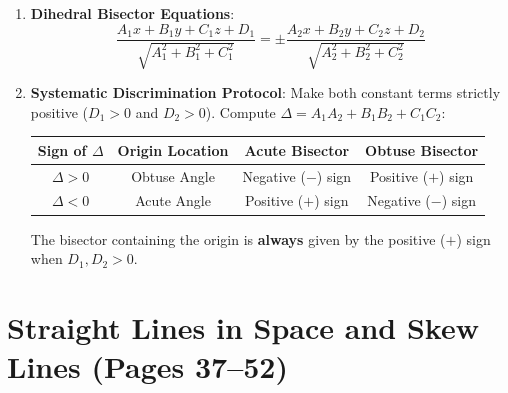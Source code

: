\begin{theorembox}
\begin{enumerate}
    \item \textbf{Dihedral Bisector Equations}:
    \begin{equation}
        \boxed{\frac{A_1 x + B_1 y + C_1 z + D_1}{\sqrt{A_1^2 + B_1^2 + C_1^2}} = \pm \frac{A_2 x + B_2 y + C_2 z + D_2}{\sqrt{A_2^2 + B_2^2 + C_2^2}}}
    \end{equation}
    \item \textbf{Systematic Discrimination Protocol}:
    Make both constant terms strictly positive ($D_1 > 0$ and $D_2 > 0$). Compute $\Delta = A_1 A_2 + B_1 B_2 + C_1 C_2$:
    \begin{center}
    \small
    \renewcommand{\arraystretch}{1.2}
    \setlength{\tabcolsep}{5pt}
    \begin{tabular}{|c|c|c|c|}
    \hline
    \textbf{Sign of $\Delta$} & \textbf{Origin Location} & \textbf{Acute Bisector} & \textbf{Obtuse Bisector} \\
    \hline
    $\Delta > 0$ & Obtuse Angle & Negative ($-$) sign & Positive ($+$) sign \\
    $\Delta < 0$ & Acute Angle & Positive ($+$) sign & Negative ($-$) sign \\
    \hline
    \end{tabular}
    \end{center}
    The bisector containing the origin is \textbf{always} given by the positive ($+$) sign when $D_1, D_2 > 0$.
\end{enumerate}
\end{theorembox}

\section{Straight Lines in Space and Skew Lines (Pages 37--52)}

